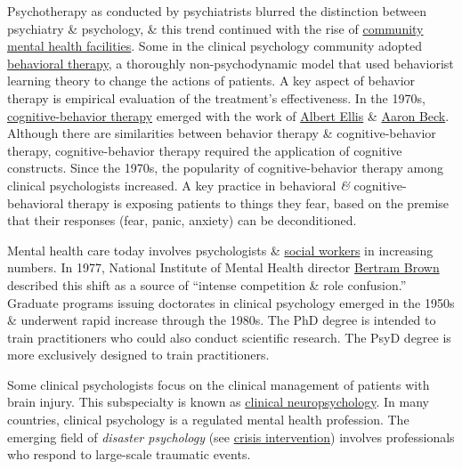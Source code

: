 \documentclass[oneside]{book}
\numberwithin{equation}{section}
\begin{document}
Psychotherapy as conducted by psychiatrists blurred the distinction between psychiatry \& psychology, \& this trend continued with the rise of \href{https://en.wikipedia.org/wiki/Community_mental_health_service}{community mental health facilities}. Some in the clinical psychology community adopted \href{https://en.wikipedia.org/wiki/Behavioral_therapy}{behavioral therapy}, a thoroughly non-psychodynamic model that used behaviorist learning theory to change the actions of patients. A key aspect of behavior therapy is empirical evaluation of the treatment's effectiveness. In the 1970s, \href{https://en.wikipedia.org/wiki/Cognitive-behavior_therapy}{cognitive-behavior therapy} emerged with the work of \href{https://en.wikipedia.org/wiki/Albert_Ellis}{Albert Ellis} \& \href{https://en.wikipedia.org/wiki/Aaron_Beck}{Aaron Beck}. Although there are similarities between behavior therapy \& cognitive-behavior therapy, cognitive-behavior therapy required the application of cognitive constructs. Since the 1970s, the popularity of cognitive-behavior therapy among clinical psychologists increased. A key practice in behavioral \textit{\&} cognitive-behavioral therapy is exposing patients to things they fear, based on the premise that their responses (fear, panic, anxiety) can be deconditioned.

Mental health care today involves psychologists \& \href{https://en.wikipedia.org/wiki/Social_work}{social workers} in increasing numbers. In 1977, National Institute of Mental Health director \href{https://en.wikipedia.org/wiki/Bertram_S._Brown}{Bertram Brown} described this shift as a source of ``intense competition \& role confusion.'' Graduate programs issuing doctorates in clinical psychology emerged in the 1950s \& underwent rapid increase through the 1980s. The PhD degree is intended to train practitioners who could also conduct scientific research. The PsyD degree is more exclusively designed to train practitioners.

Some clinical psychologists focus on the clinical management of patients with brain injury. This subspecialty is known as \href{https://en.wikipedia.org/wiki/Clinical_neuropsychology}{clinical neuropsychology}. In many countries, clinical psychology is a regulated mental health profession. The emerging field of \textit{disaster psychology} (see \href{https://en.wikipedia.org/wiki/Crisis_intervention}{crisis intervention}) involves professionals who respond to large-scale traumatic events.
\end{document}
